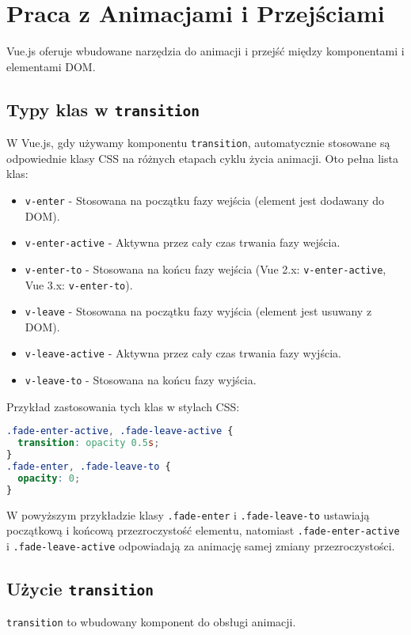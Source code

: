 \documentclass[a4paper,12pt]{article}
\begin{document}
\section{Praca z Animacjami i Przejściami}
Vue.js oferuje wbudowane narzędzia do animacji i przejść między komponentami i elementami DOM.

\subsection{Typy klas w \texttt{transition}}
W Vue.js, gdy używamy komponentu \texttt{transition}, automatycznie stosowane są odpowiednie klasy CSS na różnych etapach cyklu życia animacji. Oto pełna lista klas:

\begin{itemize}
    \item \texttt{v-enter} - Stosowana na początku fazy wejścia (element jest dodawany do DOM).
    \item \texttt{v-enter-active} - Aktywna przez cały czas trwania fazy wejścia.
    \item \texttt{v-enter-to} - Stosowana na końcu fazy wejścia (Vue 2.x: \texttt{v-enter-active}, Vue 3.x: \texttt{v-enter-to}).
    \item \texttt{v-leave} - Stosowana na początku fazy wyjścia (element jest usuwany z DOM).
    \item \texttt{v-leave-active} - Aktywna przez cały czas trwania fazy wyjścia.
    \item \texttt{v-leave-to} - Stosowana na końcu fazy wyjścia.
\end{itemize}

Przykład zastosowania tych klas w stylach CSS:

\begin{lstlisting}[language=CSS]
.fade-enter-active, .fade-leave-active {
  transition: opacity 0.5s;
}
.fade-enter, .fade-leave-to {
  opacity: 0;
}
\end{lstlisting}

W powyższym przykładzie klasy \texttt{.fade-enter} i \texttt{.fade-leave-to} ustawiają początkową i końcową przezroczystość elementu, natomiast \texttt{.fade-enter-active} i \texttt{.fade-leave-active} odpowiadają za animację samej zmiany przezroczystości.


\subsection{Użycie \texttt{transition}}
\texttt{transition} to wbudowany komponent do obsługi animacji.
\end{document}
